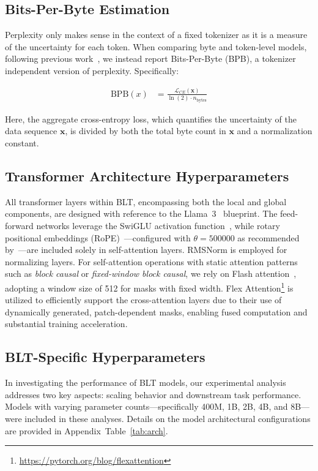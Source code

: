 \subsection{Bits-Per-Byte Estimation} Perplexity only makes sense in the context of a fixed tokenizer as it is a measure of the uncertainty for each token. When comparing byte and token-level models, following previous work~\citep{xue2022byt5, yu2023megabyte, wang2024mambabyte}, we instead report Bits-Per-Byte (BPB), a tokenizer independent version of perplexity. Specifically:

\begin{align}
    \text{BPB}(x)&= \frac{\mathcal{L}_{CE}(\pmb{x})}{\ln(2)\cdot n_{\text{bytes}}}
\end{align}

Here, the aggregate cross-entropy loss, which quantifies the uncertainty of the data sequence $\pmb{x}$, is divided by both the total byte count in $\pmb{x}$ and a normalization constant.

\subsection{Transformer Architecture Hyperparameters} All transformer layers within {\textsc BLT}, encompassing both the local and global components, are designed with reference to the Llama~3~\citep{dubey2024llama} blueprint. The feed-forward networks leverage the SwiGLU activation function~\citep{swiglu}, while rotary positional embeddings (RoPE)~\citep{RoPe}—configured with $\theta=500000$ as recommended by~\citep{xiong2024effective}—are included solely in self-attention layers. RMSNorm \citep{RMSNorm} is employed for normalizing layers. For self-attention operations with static attention patterns such as \textit{block causal} or \textit{fixed-window block causal}, we rely on Flash attention~\citep{dao2022flashattention}, adopting a window size of 512 for masks with fixed width. Flex Attention\footnote{\url{https://pytorch.org/blog/flexattention}} is utilized to efficiently support the cross-attention layers due to their use of dynamically generated, patch-dependent masks, enabling fused computation and substantial training acceleration.

\subsection{{\textsc BLT}-Specific Hyperparameters}

In investigating the performance of {\textsc BLT} models, our experimental analysis addresses two key aspects: scaling behavior and downstream task performance. Models with varying parameter counts—specifically 400M, 1B, 2B, 4B, and 8B—were included in these analyses. Details on the model architectural configurations are provided in Appendix~Table~\ref{tab:arch}.

